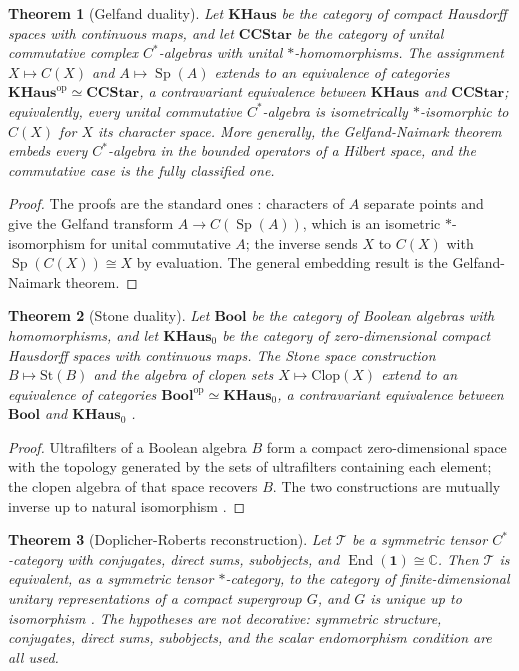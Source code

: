 \documentclass[11pt,letterpaper]{article}
\DeclareMathOperator{\End}{End}
\DeclareMathOperator{\Sp}{Sp}
\newtheorem{theorem}{Theorem}[section]
\theoremstyle{definition}
\theoremstyle{remark}
\begin{document}
\begin{theorem}[Gelfand duality]
\label{thm:gelfand}
Let $\mathbf{KHaus}$ be the category of compact Hausdorff spaces with continuous maps, and let $\mathbf{CCStar}$ be the category of unital commutative complex $C^*$-algebras with unital $*$-homomorphisms. The assignment $X \mapsto C(X)$ and $A \mapsto \Sp(A)$ extends to an equivalence of categories $\mathbf{KHaus}^{\mathrm{op}} \simeq \mathbf{CCStar}$, a contravariant equivalence between $\mathbf{KHaus}$ and $\mathbf{CCStar}$; equivalently, every unital commutative $C^*$-algebra is isometrically $*$-isomorphic to $C(X)$ for $X$ its character space. More generally, the Gelfand-Naimark theorem \cite{gn} embeds every $C^*$-algebra in the bounded operators of a Hilbert space, and the commutative case is the fully classified one.
\end{theorem}

\begin{proof}
The proofs are the standard ones \cite{gn}: characters of $A$ separate points and give the Gelfand transform $A \to C(\Sp(A))$, which is an isometric $*$-isomorphism for unital commutative $A$; the inverse sends $X$ to $C(X)$ with $\Sp(C(X)) \cong X$ by evaluation. The general embedding result is the Gelfand-Naimark theorem.
\end{proof}

\begin{theorem}[Stone duality]
\label{thm:stone}
Let $\mathbf{Bool}$ be the category of Boolean algebras with homomorphisms, and let $\mathbf{KHaus}_0$ be the category of zero-dimensional compact Hausdorff spaces with continuous maps. The Stone space construction $B \mapsto \mathrm{St}(B)$ and the algebra of clopen sets $X \mapsto \mathrm{Clop}(X)$ extend to an equivalence of categories $\mathbf{Bool}^{\mathrm{op}} \simeq \mathbf{KHaus}_0$, a contravariant equivalence between $\mathbf{Bool}$ and $\mathbf{KHaus}_0$ \cite{stone}.
\end{theorem}

\begin{proof}
Ultrafilters of a Boolean algebra $B$ form a compact zero-dimensional space with the topology generated by the sets of ultrafilters containing each element; the clopen algebra of that space recovers $B$. The two constructions are mutually inverse up to natural isomorphism \cite{stone}.
\end{proof}

\begin{theorem}[Doplicher-Roberts reconstruction]
\label{thm:dr}
Let $\mathcal{T}$ be a symmetric tensor $C^*$-category with conjugates, direct sums, subobjects, and $\End(\mathbf{1}) \cong \mathbb{C}$. Then $\mathcal{T}$ is equivalent, as a symmetric tensor $*$-category, to the category of finite-dimensional unitary representations of a compact supergroup $G$, and $G$ is unique up to isomorphism \cite{dr}. The hypotheses are not decorative: symmetric structure, conjugates, direct sums, subobjects, and the scalar endomorphism condition are all used.
\end{theorem}
\end{document}
